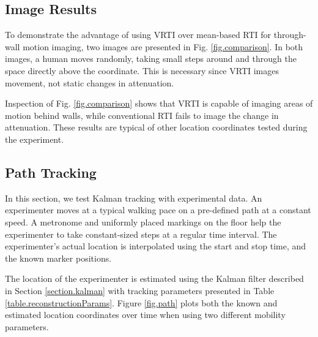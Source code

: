 \documentclass[journal]{IEEEtran}
\begin{document}
\subsection{Image Results}
\begin{figure*}[htp]
\centering
{}
\caption{Comparison of mean and variance-based RTI results for through-wall imaging. The experimenter is moving at point $(17.6,21.3)$ in both of these images.}
\label{fig.comparison}
\end{figure*}
To demonstrate the advantage of using VRTI over mean-based RTI for through-wall motion imaging, two images are presented in Fig. \ref{fig.comparison}. In both images, a human moves randomly, taking small steps around and through the space directly above the coordinate. This is necessary since VRTI images movement, not static changes in attenuation. 

Inspection of Fig. \ref{fig.comparison} shows that VRTI is capable of imaging areas of motion behind walls, while conventional RTI fails to image the change in attenuation.  These results are typical of other location coordinates tested during the experiment.

\subsection{Path Tracking}
In this section, we test Kalman tracking with experimental data. An experimenter moves at a typical walking pace on a pre-defined path at a constant speed. A metronome and uniformly placed markings on the floor help the experimenter to take constant-sized steps at a regular time interval. The experimenter's actual location is interpolated using the start and stop time, and the known marker positions.

The location of the experimenter is estimated using the Kalman filter described in Section \ref{section.kalman} with tracking parameters presented in Table \ref{table.reconstructionParams}.  Figure \ref{fig.path} plots both the known and estimated location coordinates over time when using two different mobility parameters.
\end{document}
